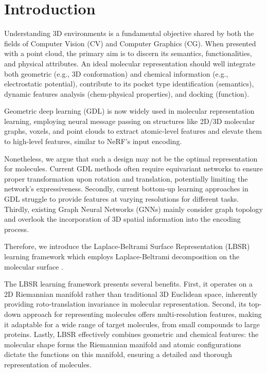\section{Introduction}
Understanding 3D environments is a fundamental objective shared by both the fields of Computer Vision (CV) and Computer Graphics (CG).
When presented with a point cloud, the primary aim is to discern its semantics, functionalities, and physical attributes.
An ideal molecular representation should well integrate both geometric (e.g., 3D conformation) and chemical information (e.g., electrostatic potential), contribute to its pocket type identification (semantics), dynamic features analysis (chem-physical properties), and docking (function).

Geometric deep learning (GDL) is now widely used in molecular representation learning, employing neural message passing on structures like 2D/3D molecular graphs, voxels, and point clouds to extract atomic-level features and elevate them to high-level features, similar to NeRF's\cite{nerfpytorch} input encoding. 

Nonetheless, we argue that such a design may not be the optimal representation for molecules. Current GDL methods often require equivariant networks to ensure proper transformation upon rotation and translation, potentially limiting the network's expressiveness. Secondly, current bottom-up learning approaches in GDL struggle to provide features at varying resolutions for different tasks. Thirdly, existing Graph Neural Networks (GNNs) mainly consider graph topology and overlook the incorporation of 3D spatial information into the encoding process.

Therefore, we introduce the Laplace-Beltrami Surface Representation (LBSR) learning framework which employs Laplace-Beltrami decomposition on the molecular surface \cite{shape-dna}.

The LBSR learning framework presents several benefits. First, it operates on a 2D Riemannian manifold rather than traditional 3D Euclidean space, inherently providing roto-translation invariance in molecular representation. Second, its top-down approach for representing molecules offers multi-resolution features, making it adaptable for a wide range of target molecules, from small compounds to large proteins. Lastly, LBSR effectively combines geometric and chemical features: the molecular shape forms the Riemannian manifold and atomic configurations dictate the functions on this manifold, ensuring a detailed and thorough representation of molecules.


